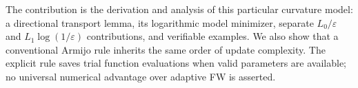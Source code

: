 The contribution is the derivation and analysis of this particular curvature
model: a directional transport lemma, its logarithmic model minimizer,
separate $L_0/\varepsilon$ and $L_1\log(1/\varepsilon)$ contributions,
and verifiable examples. We also show that a conventional Armijo rule inherits
the same order of update complexity. The explicit rule saves trial function
evaluations when valid parameters are available; no universal numerical
advantage over adaptive FW is asserted.
